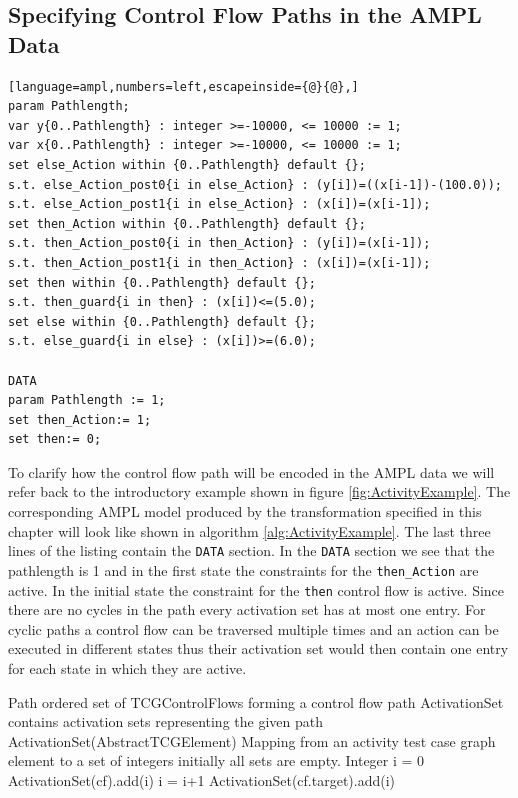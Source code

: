 \subsection{Specifying Control Flow Paths in the AMPL Data}
\begin{algorithm}
\begin{lstlisting}[language=ampl,numbers=left,escapeinside={@}{@},]
param Pathlength;
var y{0..Pathlength} : integer >=-10000, <= 10000 := 1;
var x{0..Pathlength} : integer >=-10000, <= 10000 := 1;
set else_Action within {0..Pathlength} default {};
s.t. else_Action_post0{i in else_Action} : (y[i])=((x[i-1])-(100.0));
s.t. else_Action_post1{i in else_Action} : (x[i])=(x[i-1]);
set then_Action within {0..Pathlength} default {};
s.t. then_Action_post0{i in then_Action} : (y[i])=(x[i-1]);
s.t. then_Action_post1{i in then_Action} : (x[i])=(x[i-1]);
set then within {0..Pathlength} default {};
s.t. then_guard{i in then} : (x[i])<=(5.0);
set else within {0..Pathlength} default {};
s.t. else_guard{i in else} : (x[i])>=(6.0);

DATA
param Pathlength := 1;
set then_Action:= 1;
set then:= 0;
\end{lstlisting}
\label{alg:ActivityExample}
\caption{Example AMPL model with corresponding data section specifying a control flow path}
\end{algorithm}
To clarify how the control flow path will be encoded in the AMPL data we will refer back to the introductory example shown in figure \ref{fig:ActivityExample}. The corresponding AMPL model produced by the transformation specified in this chapter will look like shown in algorithm \ref{alg:ActivityExample}. The last three lines of the listing contain the \verb=DATA= section. In the \verb=DATA= section we see that the pathlength is 1 and in the first state the constraints for the \verb=then_Action= are active. In the initial state the constraint for the \verb=then= control flow is active. Since there are no cycles in the path every activation set has at most one entry. For cyclic paths a control flow can be traversed multiple times and an action can be executed in different states thus their activation set would then contain one entry for each state in which they are active. \\
\begin{algorithm}
\begin{algorithmic}
\Require Path \Comment ordered set of TCGControlFlows forming a control flow path
\Ensure ActivationSet contains activation sets representing the given path
\State ActivationSet(AbstractTCGElement)  \Comment Mapping from an activity test case graph element to a set of integers initially all sets are empty.
\State Integer i = 0
\State ActivationSet(cf).add(i)
\EndIf
{}
\State i = i+1
\State ActivationSet(cf.target).add(i)
\EndIf
\EndFor
\end{algorithmic}
\caption{Transfromation from a control flow path to a map of activation sets}
\label{alg:controlFlowPathTOActivationSet}
\end{algorithm}

